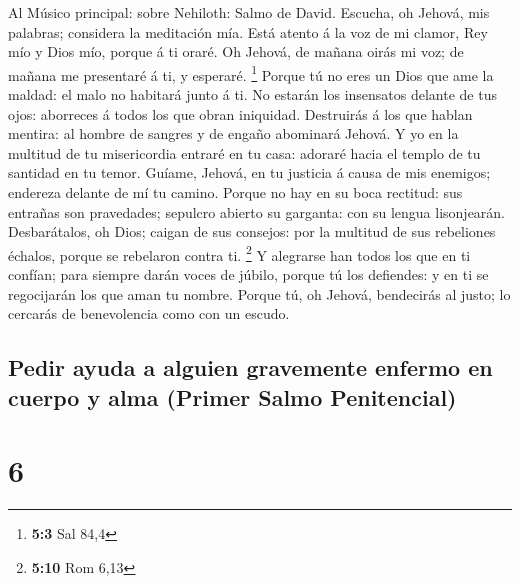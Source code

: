  Al Músico principal: sobre Nehiloth: Salmo de David.
Escucha, oh Jehová, mis palabras; considera la meditación mía.
 Está atento á la voz de mi clamor, Rey mío y Dios mío,
porque á ti oraré.  Oh Jehová, de mañana oirás mi voz; de
mañana me presentaré á ti, y esperaré. \footnote{\textbf{5:3} Sal 84,4}
 Porque tú no eres un Dios que ame la maldad: el malo no
habitará junto á ti.  No estarán los insensatos delante de
tus ojos: aborreces á todos los que obran iniquidad. 
Destruirás á los que hablan mentira: al hombre de sangres y de engaño
abominará Jehová.  Y yo en la multitud de tu misericordia
entraré en tu casa: adoraré hacia el templo de tu santidad en tu temor.
 Guíame, Jehová, en tu justicia á causa de mis enemigos;
endereza delante de mí tu camino.  Porque no hay en su boca
rectitud: sus entrañas son pravedades; sepulcro abierto su garganta: con
su lengua lisonjearán.  Desbarátalos, oh Dios; caigan de
sus consejos: por la multitud de sus rebeliones échalos, porque se
rebelaron contra ti. \footnote{\textbf{5:10} Rom 6,13}  Y
alegrarse han todos los que en ti confían; para siempre darán voces de
júbilo, porque tú los defiendes: y en ti se regocijarán los que aman tu
nombre.  Porque tú, oh Jehová, bendecirás al justo; lo
cercarás de benevolencia como con un escudo.

\hypertarget{pedir-ayuda-a-alguien-gravemente-enfermo-en-cuerpo-y-alma-primer-salmo-penitencial}{%
\subsection{Pedir ayuda a alguien gravemente enfermo en cuerpo y alma
(Primer Salmo
Penitencial)}\label{pedir-ayuda-a-alguien-gravemente-enfermo-en-cuerpo-y-alma-primer-salmo-penitencial}}

\hypertarget{section-5}{%
\section{6}\label{section-5}}

